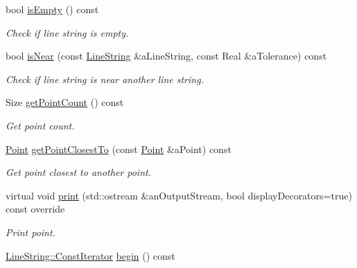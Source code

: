 \begin{DoxyCompactItemize}
bool \hyperlink{classlibrary_1_1math_1_1geom_1_1d3_1_1objects_1_1_line_string_a33e1e2dfcd7352eb41b6991bd97ec6cd}{is\+Empty} () const
\begin{DoxyCompactList}\small\item\em Check if line string is empty. \end{DoxyCompactList}\item 
bool \hyperlink{classlibrary_1_1math_1_1geom_1_1d3_1_1objects_1_1_line_string_acbfb3f1c542793b9fa810ba8626633c4}{is\+Near} (const \hyperlink{classlibrary_1_1math_1_1geom_1_1d3_1_1objects_1_1_line_string}{Line\+String} \&a\+Line\+String, const Real \&a\+Tolerance) const
\begin{DoxyCompactList}\small\item\em Check if line string is near another line string. \end{DoxyCompactList}\item 
Size \hyperlink{classlibrary_1_1math_1_1geom_1_1d3_1_1objects_1_1_line_string_ac635c796406d38f6f1019b64cab9b42c}{get\+Point\+Count} () const
\begin{DoxyCompactList}\small\item\em Get point count. \end{DoxyCompactList}\item 
\hyperlink{classlibrary_1_1math_1_1geom_1_1d3_1_1objects_1_1_point}{Point} \hyperlink{classlibrary_1_1math_1_1geom_1_1d3_1_1objects_1_1_line_string_a39cf8a2be15c3f1686ed855659ded104}{get\+Point\+Closest\+To} (const \hyperlink{classlibrary_1_1math_1_1geom_1_1d3_1_1objects_1_1_point}{Point} \&a\+Point) const
\begin{DoxyCompactList}\small\item\em Get point closest to another point. \end{DoxyCompactList}\item 
virtual void \hyperlink{classlibrary_1_1math_1_1geom_1_1d3_1_1objects_1_1_line_string_a289414dbfc4ff32520f546c8a435170f}{print} (std\+::ostream \&an\+Output\+Stream, bool display\+Decorators=true) const override
\begin{DoxyCompactList}\small\item\em Print point. \end{DoxyCompactList}\item 
\hyperlink{classlibrary_1_1math_1_1geom_1_1d3_1_1objects_1_1_line_string_a87db0104282f9fcccdc5b1b99e2301e5}{Line\+String\+::\+Const\+Iterator} \hyperlink{classlibrary_1_1math_1_1geom_1_1d3_1_1objects_1_1_line_string_a218630b02ea7a4f32872fd1ee25f3359}{begin} () const

\end{DoxyCompactItemize}
